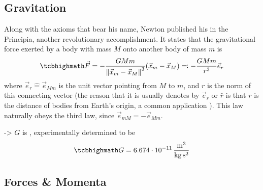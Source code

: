 \documentclass[../class_mech_main.tex]{subfiles}
\begin{document}
		\subsection{Gravitation}
Along with the axioms that bear his name, Newton published his  in the Principia, another revolutionary accomplishment. It states that the gravitational force exerted by a body with mass $M$ onto another body of mass $m$ is
\begin{equation}\label{eq:newton_gravitation_law}
	\eqbox{
		\vec{F} = - \frac{G M m}{\norm{\vec{x}_m - \vec{x}_M}^3} (\vec{x}_m - \vec{x}_M) \eqqcolon - \frac{G M m}{r^3} \vec{e}_r
	}
\end{equation}
where $\vec{e}_r \hat{=} \vec{e}_{Mm}$ is the unit vector pointing from $M$ to $m$, and $r$ is the norm of this connecting vector (the reason that it is usually denotes by $\vec{e}_r$ or $\hat{r}$ is that $r$ is the distance of bodies from Earth's origin, a common application ). This law naturally obeys the third law, since $\vec{e}_{mM} = - \vec{e}_{Mm}$.


-> $G$ is , experimentally determined to be
\begin{equation}
	\eqbox{
		G = 6.674 \cdot 10^{-11} \, \frac{\mathrm{m}^3}{\mathrm{kg} \, \mathrm{s}^2}
	}
\end{equation}



        \subsection{Forces \& Momenta}
		\label{sec:forces_and_momenta}
% 
% 

\end{document}
